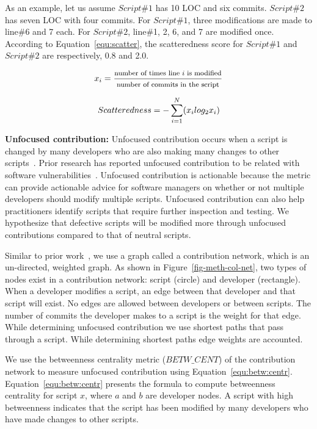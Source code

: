 \documentclass[smallextended]{svjour3}       %
\begin{document}
As an example, let us assume $Script\#1$ has 10 LOC and six commits. $Script\#2$ has seven LOC with four commits. For $Script\#1$, three modifications are made to line\#6 and 7 each. For $Script\#2$, line\#1, 2, 6, and 7 are modified once. According to Equation~\ref{equ:scatter}, the scatteredness score for $Script\#1$ and $Script\#2$ are respectively, 0.8 and 2.0.  

\begin{equation}
\footnotesize{x_i} = \frac{\text{\footnotesize{number of times line $i$ is modified}}}{\text{\footnotesize{number of commits in the script}}}
\label{equ:pi}
\end{equation}

\begin{equation}
\footnotesize{Scatteredness}= -\sum_{i=1}^{N}(x_ilog_2x_i)
\label{equ:scatter}
\end{equation}

\textbf{Unfocused contribution:} Unfocused contribution occurs when a script is changed by many developers who are also making many changes to other scripts~\citep{Pinzger:Failure}. Prior research has reported unfocused contribution to be related with software vulnerabilities~\citep{Meneely:Linus}. Unfocused contribution is actionable because the metric can provide actionable advice for software managers on whether or not multiple developers should modify multiple scripts. Unfocused contribution can also help practitioners identify scripts that require further inspection and testing. We hypothesize that defective scripts will be modified more through unfocused contributions compared to that of neutral scripts. 

Similar to prior work~\citep{Meneely:Linus}, we use a graph called a contribution network, which is an un-directed, weighted graph. As shown in Figure~\ref{fig-meth-col-net}, two types of nodes exist in a contribution network: script (circle) and developer (rectangle). When a developer modifies a script, an edge between that developer and that script will exist. No edges are allowed between developers or between scripts. The number of commits the developer makes to a script is the weight for that edge. While determining unfocused contribution we use shortest paths that pass through a script. While determining shortest paths edge weights are accounted. 

We use the betweenness centrality metric ($BETW\_CENT$) of the contribution network to measure unfocused contribution using Equation~\ref{equ:betw:centr}. Equation~\ref{equ:betw:centr} presents the formula to compute betweenness centrality for script $x$, where $a$ and $b$ are developer nodes. A script with high betweenness indicates that the script has been modified by many developers who have made changes to other scripts. 
\end{document}
